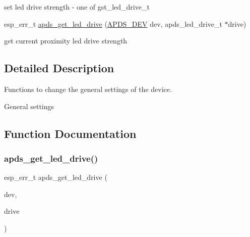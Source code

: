 \begin{DoxyCompactItemize}
\begin{DoxyCompactList}\small\item\em 
\begin{DoxyItemize}
\item set led drive strength -\/ one of gst\+\_\+led\+\_\+drive\+\_\+t 
\end{DoxyItemize}\end{DoxyCompactList}\item 
esp\+\_\+err\+\_\+t \hyperlink{group__APDS9960__GeneralFunctions_gac4a9db2bdfc2532aa8b2a2d2dcc56a17}{apds\+\_\+get\+\_\+led\+\_\+drive} (\hyperlink{structAPDS9960__Driver}{A\+P\+D\+S\+\_\+\+D\+EV} dev, apds\+\_\+led\+\_\+drive\+\_\+t $\ast$drive)
\begin{DoxyCompactList}\small\item\em 
\begin{DoxyItemize}
\item get current proximity led drive strength 
\end{DoxyItemize}\end{DoxyCompactList}\end{DoxyCompactItemize}


\subsection{Detailed Description}
Functions to change the general settings of the device. 

General settings 

\subsection{Function Documentation}
\mbox{\label{group__APDS9960__GeneralFunctions_gac4a9db2bdfc2532aa8b2a2d2dcc56a17}} 
\subsubsection{\texorpdfstring{apds\+\_\+get\+\_\+led\+\_\+drive()}{apds\_get\_led\_drive()}}
{\footnotesize\ttfamily esp\+\_\+err\+\_\+t apds\+\_\+get\+\_\+led\+\_\+drive (\begin{DoxyParamCaption}\item[{\hyperlink{structAPDS9960__Driver}{A\+P\+D\+S\+\_\+\+D\+EV}}]{dev,  }\item[{apds\+\_\+led\+\_\+drive\+\_\+t $\ast$}]{drive }\end{DoxyParamCaption})}




